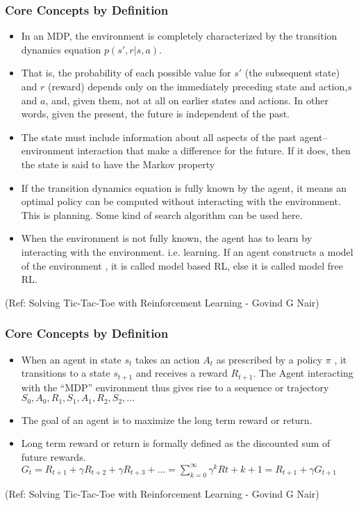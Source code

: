 \begin{frame}[fragile]\frametitle{Core Concepts by Definition}


\begin{itemize}
\item In an MDP, the environment is completely characterized by the transition dynamics equation $p(s',r|s,a)$.
\item That is, the probability of each possible value for $s'$ (the subsequent state) and $r$ (reward) depends only on the immediately preceding state and action,$s$ and $a$, and, given them, not at all on earlier states and actions. In other words, given the present, the future is independent of the past.
\item The state must include information about all aspects of the past agent–environment interaction that make a difference for the future. If it does, then the state is said to have the Markov property
\item If the transition dynamics equation is fully known by the agent, it means an optimal policy can be computed without interacting with the environment. This is planning. Some kind of search algorithm can be used here.
\item When the environment is not fully known, the agent has to learn by interacting with the environment. i.e. learning. If an agent constructs a model of the environment , it is called model based RL, else it is called model free RL.
\end{itemize}



{\tiny (Ref: Solving Tic-Tac-Toe with Reinforcement Learning - Govind G Nair)}

\end{frame}

\begin{frame}[fragile]\frametitle{Core Concepts by Definition}


\begin{itemize}
\item When an agent in state $s_t$ takes an action $A_t$ as prescribed by a policy $\pi$ , it transitions to a state $s_{t+1}$ and receives a reward $R_{t+1}$. The Agent interacting with the ``MDP'' environment thus gives rise to a sequence or trajectory $S_0,A_0,R_1,S_1,A_1,R_2,S_2,\ldots$
\item The goal of an agent is to maximize the long term reward or return.
\item Long term reward or return is formally defined as the discounted sum of future rewards. $G_t = R_{t+1} + \gamma R_{t+2} + \gamma R_{t+3} + \ldots = \sum_{k=0}^{\infty} \gamma^k R{t+k+1} = R_{t+1} + \gamma G_{t+1}$
\end{itemize}



{\tiny (Ref: Solving Tic-Tac-Toe with Reinforcement Learning - Govind G Nair)}

\end{frame}


